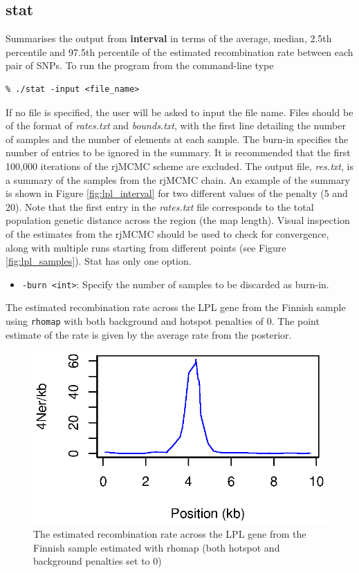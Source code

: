\documentclass[a4paper,10pt,fullpage]{article}
\begin{document}
\subsection{stat}

Summarises the output from {\bf interval} in terms of the average,
median, 2.5th percentile and 97.5th percentile of the estimated
recombination rate between each pair of SNPs.  To run the program
from the command-line type\\
\begin{verbatim}
% ./stat -input <file_name>
\end{verbatim}
If no file is specified, the user will be asked to input the file
name.  Files should be of the format of {\it rates.txt} and {\it
bounds.txt}, with the first line detailing the number of samples
and the number of elements at each sample.  The burn-in specifies
the number of entries to be ignored in the summary.  It is
recommended that the first 100,000 iterations of the rjMCMC scheme
are excluded.  The output file, {\it res.txt}, is a summary of the
samples from the rjMCMC chain. An example of the summary is shown
in Figure \ref{fig:lpl_interval} for two different values of the
penalty (5 and 20). Note that the first entry in the {\it
rates.txt} file corresponds to the total population genetic
distance across the region (the map length).  Visual inspection of
the estimates from the rjMCMC should be used to check for
convergence, along with multiple runs starting from different
points (see Figure \ref{fig:lpl_samples}).  Stat has only one option.

\begin{itemize}
\item \verb+-burn <int>+: Specify the number of samples to be discarded as burn-in.
\end{itemize}

The estimated recombination rate across the LPL gene from
the Finnish sample using {\verb+rhomap+} with both background and hotspot penalties of 0. The
point estimate of the rate is given by the average rate from the posterior.

\begin{figure}
\linespread{1.3} \centering
\includegraphics[scale=1.0]{lpl_rhomap.eps}
\caption{The estimated recombination rate across the LPL gene from the Finnish sample estimated with rhomap (both hotspot and background penalties set to 0)}
\label{fig:lpl_rhomap}
\end{figure}
\end{document}
